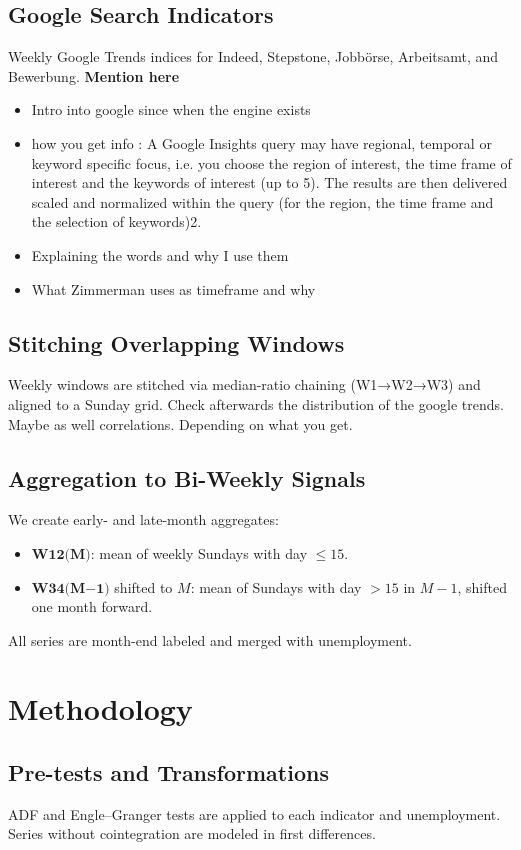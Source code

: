 \documentclass[11pt,a4paper]{article}
\begin{document}
\subsection{Google Search Indicators}
Weekly Google Trends indices for Indeed, Stepstone, Jobbörse, Arbeitsamt, and Bewerbung.
\textbf{Mention here}
\begin{itemize}
    \item Intro into google since when the engine exists 
    \item how you get info : A Google Insights query may have regional, temporal or keyword specific focus,
i.e. you choose the region of interest, the time frame of interest and the keywords of interest (up
to 5). The results are then delivered scaled and normalized within the query (for the region, the
time frame and the selection of keywords)2. 
\item Explaining the words and why I use them 
\item  What Zimmerman uses as timeframe and why
\end{itemize}
\subsection{Stitching Overlapping Windows}
Weekly windows are stitched via median-ratio chaining (W1→W2→W3) and aligned to a Sunday grid.
Check afterwards the distribution of the google trends.
Maybe as well correlations. Depending on what you get.

\subsection{Aggregation to Bi-Weekly Signals}
We create early- and late-month aggregates:
\begin{itemize}[leftmargin=*]
  \item $\textbf{W12(M)}$: mean of weekly Sundays with day $\le 15$.
  \item $\textbf{W34(M−1)}$ shifted to $M$: mean of Sundays with day $>15$ in $M-1$, shifted one month forward.
\end{itemize}
All series are month-end labeled and merged with unemployment.

\section{Methodology}
\subsection{Pre-tests and Transformations}
ADF and Engle–Granger tests are applied to each indicator and unemployment. Series without cointegration are modeled in first differences.
\end{document}
